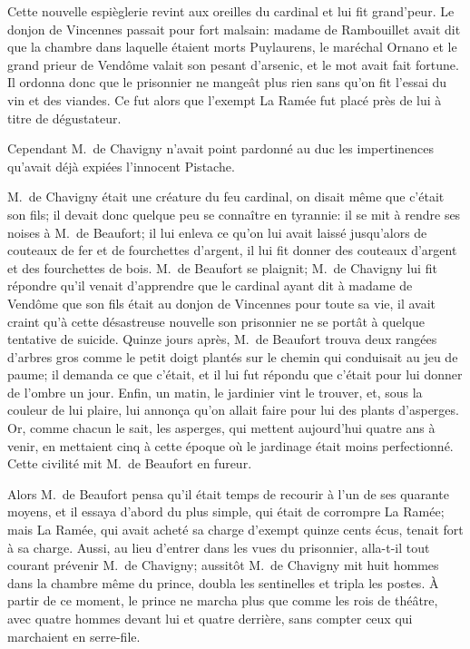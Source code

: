 Cette nouvelle espièglerie revint aux oreilles du cardinal et lui fit grand'peur. Le donjon de Vincennes passait pour fort malsain: madame de Rambouillet avait dit que la chambre dans laquelle étaient morts Puylaurens, le maréchal Ornano et le grand prieur de Vendôme valait son pesant d'arsenic, et le mot avait fait fortune. Il ordonna donc que le prisonnier ne mangeât plus rien sans qu'on fit l'essai du vin et des viandes. Ce fut alors que l'exempt La Ramée fut placé près de lui à titre de dégustateur.

Cependant M.~de Chavigny n'avait point pardonné au duc les impertinences qu'avait déjà expiées l'innocent Pistache.

M.~de Chavigny était une créature du feu cardinal, on disait même que c'était son fils; il devait donc quelque peu se connaître en tyrannie: il se mit à rendre ses noises à M.~de Beaufort; il lui enleva ce qu'on lui avait laissé jusqu'alors de couteaux de fer et de fourchettes d'argent, il lui fit donner des couteaux d'argent et des fourchettes de bois. M.~de Beaufort se plaignit; M.~de Chavigny lui fit répondre qu'il venait d'apprendre que le cardinal ayant dit à madame de Vendôme que son fils était au donjon de Vincennes pour toute sa vie, il avait craint qu'à cette désastreuse nouvelle son prisonnier ne se portât à quelque tentative de suicide. Quinze jours après, M.~de Beaufort trouva deux rangées d'arbres gros comme le petit doigt plantés sur le chemin qui conduisait au jeu de paume; il demanda ce que c'était, et il lui fut répondu que c'était pour lui donner de l'ombre un jour. Enfin, un matin, le jardinier vint le trouver, et, sous la couleur de lui plaire, lui annonça qu'on allait faire pour lui des plants d'asperges. Or, comme chacun le sait, les asperges, qui mettent aujourd'hui quatre ans à venir, en mettaient cinq à cette époque où le jardinage était moins perfectionné. Cette civilité mit M.~de Beaufort en fureur.

Alors M.~de Beaufort pensa qu'il était temps de recourir à l'un de ses quarante moyens, et il essaya d'abord du plus simple, qui était de corrompre La Ramée; mais La Ramée, qui avait acheté sa charge d'exempt quinze cents écus, tenait fort à sa charge. Aussi, au lieu d'entrer dans les vues du prisonnier, alla-t-il tout courant prévenir M.~de Chavigny; aussitôt M.~de Chavigny mit huit hommes dans la chambre même du prince, doubla les sentinelles et tripla les postes. À partir de ce moment, le prince ne marcha plus que comme les rois de théâtre, avec quatre hommes devant lui et quatre derrière, sans compter ceux qui marchaient en serre-file.

